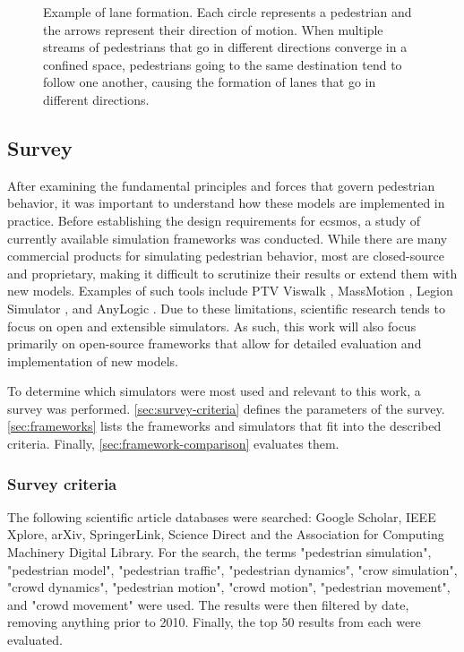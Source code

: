 \documentclass[twoside, 11pt]{article}
\begin{document}
\begin{figure}[!h]
  \centering
  
  \caption[Example of lane formation]{Example of lane formation. Each circle represents a pedestrian and the arrows represent their direction of motion. When multiple streams of pedestrians that go in different directions converge in a confined space, pedestrians going to the same destination tend to follow one another, causing the formation of lanes that go in different directions.}
  \label{fig:lane-formation}
\end{figure}

\subsection{Survey} \label{sec:existing-frameworks}

After examining the fundamental principles and forces that govern pedestrian behavior, it was important to understand how these models are implemented in practice. Before establishing the design requirements for \gls{ecsmos}, a study of currently available simulation frameworks was conducted. While there are many commercial products for simulating pedestrian behavior, most are closed-source and proprietary, making it difficult to scrutinize their results or extend them with new models. Examples of such tools include PTV Viswalk \cite{viswalk}, MassMotion \cite{massmotion}, Legion Simulator \cite{legionsimulator}, and AnyLogic \cite{anylogic}. Due to these limitations, scientific research tends to focus on open and extensible simulators. As such, this work will also focus primarily on open-source frameworks that allow for detailed evaluation and implementation of new models. 

To determine which simulators were most used and relevant to this work, a survey was performed. \autoref{sec:survey-criteria} defines the parameters of the survey. \autoref{sec:frameworks} lists the frameworks and simulators that fit into the described criteria. Finally, \autoref{sec:framework-comparison} evaluates them.

\subsubsection{Survey criteria} \label{sec:survey-criteria}

 The following scientific article databases were searched: Google Scholar, IEEE Xplore, arXiv, SpringerLink, Science Direct and the Association for Computing Machinery Digital Library. For the search, the terms "pedestrian simulation", "pedestrian model", "pedestrian traffic", "pedestrian dynamics", "crow simulation", "crowd dynamics", "pedestrian motion", "crowd motion", "pedestrian movement", and "crowd movement" were used.
The results were then filtered by date, removing anything prior to 2010. Finally, the top 50 results from each were evaluated.
\end{document}
